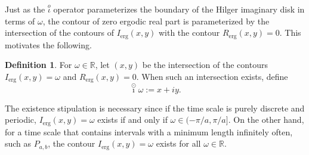 \documentclass[reqno]{amsart}
\theoremstyle{plain}
\theoremstyle{definition}
\newtheorem{definition}{Definition}
\numberwithin{theorem}{section}
\numberwithin{definition}{section}
\numberwithin{prop}{section}
\numberwithin{example}{section}
\newcommand{\Rerg}{\ensuremath{R_{\text{erg}}}}
\newcommand{\Ierg}{\ensuremath{I_{\text{erg}}}}
\def\icirc{\overset{\odot}{\imath}}
\begin{document}
Just as the $\stackrel{o}{\iota}$ operator parameterizes the boundary of the Hilger imaginary disk in terms of $\omega$, the contour of zero ergodic real part is parameterized by the intersection of the contours of $\Ierg(x,y)$ with the contour $\Rerg(x,y)=0$. This motivates the following.

\begin{definition}
For $\omega \in \mathbb{R}$, let $(x,y)$ be the intersection of the contours $\Ierg(x,y)=\omega$ and $\Rerg(x,y)=0$. When such an intersection exists, define        
\begin{equation}\label{eq:icirc}
    \icirc \omega := x+iy.
\end{equation}
\end{definition}

The existence stipulation is necessary since if the time scale is purely discrete and periodic, $\Ierg(x,y)=\omega$ exists if and only if $\omega \in (-\pi/a,\pi/a].$ On the other hand, for a time scale that contains intervals with a minimum length infinitely often, such as $P_{a,b}$, the contour $\Ierg(x,y)=\omega$ exists for all $\omega \in \mathbb{R}$. 
\end{document}
